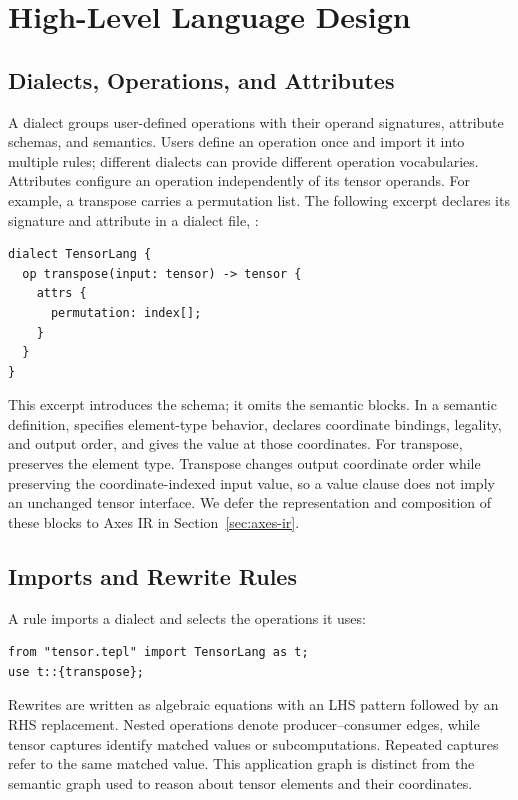 \FloatBarrier
\section{High-Level Language Design}
\label{sec:language}
\FloatBarrier
\subsection{Dialects, Operations, and Attributes}
\label{sec:dialects}
A dialect groups user-defined operations with their operand signatures,
attribute schemas, and semantics. Users define an operation once and import
it into multiple rules; different dialects can provide different operation
vocabularies. Attributes configure an operation independently of its tensor
operands. For example, a transpose carries a permutation list. The following
excerpt declares its signature and attribute in a dialect file,
:
\begin{codeblock}[H]
\begin{lstlisting}[language=TEPL]
dialect TensorLang {
  op transpose(input: tensor) -> tensor {
    attrs {
      permutation: index[];
    }
  }
}
\end{lstlisting}
\end{codeblock}
This excerpt introduces the schema; it omits the semantic blocks. In a
semantic definition,  specifies element-type behavior,
 declares coordinate bindings, legality, and output order, and
 gives the value at those coordinates. For transpose,
 preserves the element type. Transpose changes output coordinate
order while preserving the coordinate-indexed input value, so a value clause
 does not imply an unchanged tensor interface. We defer
the representation and composition of these blocks to Axes IR in
Section~\ref{sec:axes-ir}.

\FloatBarrier
\subsection{Imports and Rewrite Rules}
A rule imports a dialect and selects the operations it uses:
\begin{codeblock}[H]
\begin{lstlisting}[language=TEPL]
from "tensor.tepl" import TensorLang as t;
use t::{transpose};
\end{lstlisting}
\end{codeblock}
Rewrites are written as algebraic equations with an LHS pattern followed by an
RHS replacement. Nested operations denote producer--consumer edges, while
tensor captures identify matched values or subcomputations. Repeated captures
refer to the same matched value. This application graph is distinct from the
semantic graph used to reason about tensor elements and their coordinates.


